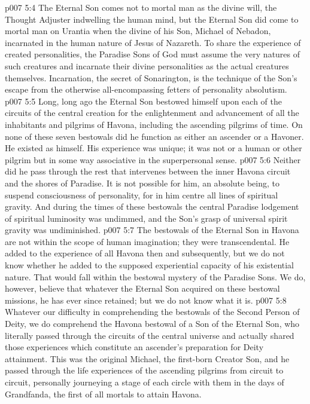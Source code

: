 \vs p007 5:4 The Eternal Son comes not to mortal man as the divine will, the Thought Adjuster indwelling the human mind, but the Eternal Son did come to mortal man on Urantia when the divine  of his Son, Michael of Nebadon, incarnated in the human nature of Jesus of Nazareth. To share the experience of created personalities, the Paradise Sons of God must assume the very natures of such creatures and incarnate their divine personalities as the actual creatures themselves. Incarnation, the secret of Sonarington, is the technique of the Son’s escape from the otherwise all\hyp{}encompassing fetters of personality absolutism.
\vs p007 5:5 \pc Long, long ago the Eternal Son bestowed himself upon each of the circuits of the central creation for the enlightenment and advancement of all the inhabitants and pilgrims of Havona, including the ascending pilgrims of time. On none of these seven bestowals did he function as either an ascender or a Havoner. He existed as himself. His experience was unique; it was not  or  a human or other pilgrim but in some way associative in the superpersonal sense.
\vs p007 5:6 Neither did he pass through the rest that intervenes between the inner Havona circuit and the shores of Paradise. It is not possible for him, an absolute being, to suspend consciousness of personality, for in him centre all lines of spiritual gravity. And during the times of these bestowals the central Paradise lodgement of spiritual luminosity was undimmed, and the Son’s grasp of universal spirit gravity was undiminished.
\vs p007 5:7 \pc The bestowals of the Eternal Son in Havona are not within the scope of human imagination; they were transcendental. He added to the experience of all Havona then and subsequently, but we do not know whether he added to the supposed experiential capacity of his existential nature. That would fall within the bestowal mystery of the Paradise Sons. We do, however, believe that whatever the Eternal Son acquired on these bestowal missions, he has ever since retained; but we do not know what it is.
\vs p007 5:8 \pc Whatever our difficulty in comprehending the bestowals of the Second Person of Deity, we do comprehend the Havona bestowal of a Son of the Eternal Son, who literally passed through the circuits of the central universe and actually shared those experiences which constitute an ascender’s preparation for Deity attainment. This was the original Michael, the first\hyp{}born Creator Son, and he passed through the life experiences of the ascending pilgrims from circuit to circuit, personally journeying a stage of each circle with them in the days of Grandfanda, the first of all mortals to attain Havona.
